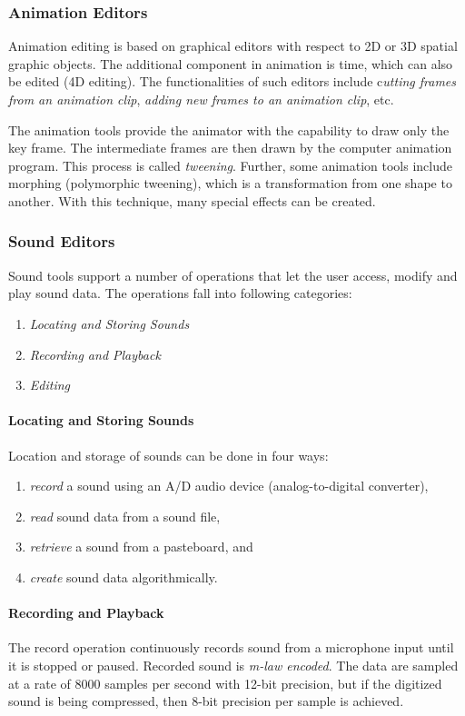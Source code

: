 \subsubsection{Animation Editors}
Animation editing is based on graphical editors with respect to 2D or 3D spatial graphic objects. The additional component in animation is time, which can also be edited (4D editing). The functionalities of such editors include c\textit{utting frames from an animation clip}, \textit{adding new frames to an animation clip}, etc.

The animation tools provide the animator with the capability to draw only the key frame. The intermediate frames are then drawn by the computer animation program. This process is called \textit{tweening}. Further, some animation tools include morphing (polymorphic tweening), which is a transformation from one shape to another. With this technique, many special effects can be created.


\subsubsection{Sound Editors}
Sound tools support a number of operations that let the user access, modify and play sound data. The operations fall into following categories:
\begin{enumerate}
	\item \textit{Locating and Storing Sounds}
	\item \textit{Recording and Playback}
	\item \textit{Editing}
\end{enumerate}

\paragraph*{Locating and Storing Sounds}
Location and storage of sounds can be done in four ways: 
\begin{enumerate}
	\item \textit{record} a sound using an A/D audio device (analog-to-digital converter), 
	\item \textit{read} sound data from a sound file,
	\item \textit{retrieve} a sound from a pasteboard, and 
	\item \textit{create} sound data algorithmically.
\end{enumerate}

\paragraph*{Recording and Playback}
The record operation continuously records sound from a microphone input until it is stopped or paused. Recorded sound is \textit{m-law encoded}. The data are sampled at a rate of 8000 samples per second with 12-bit precision, but if the digitized sound is being compressed, then 8-bit precision per sample is achieved.

